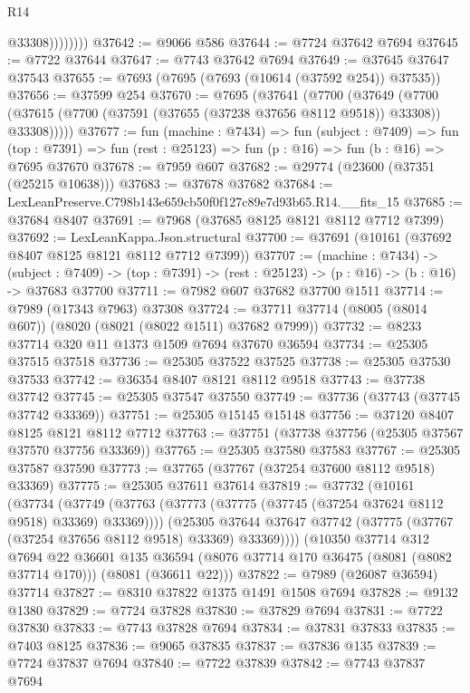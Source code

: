 \begin{lexlean}{R14}
\begin{coremodule}
                    @33308))))))))
@37642 := @9066 @586
@37644 := @7724 @37642 @7694
@37645 := @7722 @37644
@37647 := @7743 @37642 @7694
@37649 := @37645 @37647 @37543
@37655 := @7693 (@7695 (@7693 (@10614 (@37592 @254)) @37535))
@37656 := @37599 @254
@37670 := @7695
    (@37641
      (@7700
        (@37649
          (@7700 (@37615 (@7700 (@37591 (@37655 (@37238 @37656 @8112 @9518)) @33308)) @33308)))))
@37677 := fun (machine : @7434) =>
  fun (subject : @7409) =>
  fun (top : @7391) => fun (rest : @25123) => fun (p : @16) => fun (b : @16) => @7695 @37670
@37678 := @7959 @607
@37682 := @29774 (@23600 (@37351 (@25215 @10638)))
@37683 := @37678 @37682
@37684 := LexLeanPreserve.C798b143e659cb50f0f127c89e7d93b65.R14.__fits_15
@37685 := @37684 @8407
@37691 := @7968 (@37685 @8125 @8121 @8112 @7712 @7399)
@37692 := LexLeanKappa.Json.structural
@37700 := @37691 (@10161 (@37692 @8407 @8125 @8121 @8112 @7712 @7399))
@37707 := (machine : @7434) ->
  (subject : @7409) -> (top : @7391) -> (rest : @25123) -> (p : @16) -> (b : @16) -> @37683 @37700
@37711 := @7982 @607 @37682 @37700 @1511
@37714 := @7989 (@17343 @7963) @37308
@37724 := @37711 @37714 (@8005 (@8014 @607)) (@8020 (@8021 (@8022 @1511) @37682 @7999))
@37732 := @8233 @37714 @320 @11 @1373 @1509 @7694 @37670 @36594
@37734 := @25305 @37515 @37518
@37736 := @25305 @37522 @37525
@37738 := @25305 @37530 @37533
@37742 := @36354 @8407 @8121 @8112 @9518
@37743 := @37738 @37742
@37745 := @25305 @37547 @37550
@37749 := @37736 (@37743 (@37745 @37742 @33369))
@37751 := @25305 @15145 @15148
@37756 := @37120 @8407 @8125 @8121 @8112 @7712
@37763 := @37751 (@37738 @37756 (@25305 @37567 @37570 @37756 @33369))
@37765 := @25305 @37580 @37583
@37767 := @25305 @37587 @37590
@37773 := @37765 (@37767 (@37254 @37600 @8112 @9518) @33369)
@37775 := @25305 @37611 @37614
@37819 := @37732
    (@10161
      (@37734
        (@37749 (@37763 (@37773 (@37775 (@37745 (@37254 @37624 @8112 @9518) @33369) @33369))))
        (@25305 @37644 @37647 @37742 (@37775 (@37767 (@37254 @37656 @8112 @9518) @33369) @33369))))
    (@10350
      @37714
      @312
      @7694
      @22
      @36601
      @135
      @36594
      (@8076 @37714 @170 @36475 (@8081 (@8082 @37714 @170)))
      (@8081 (@36611 @22)))
@37822 := @7989 (@26087 @36594) @37714
@37827 := @8310 @37822 @1375 @1491 @1508 @7694
@37828 := @9132 @1380
@37829 := @7724 @37828
@37830 := @37829 @7694
@37831 := @7722 @37830
@37833 := @7743 @37828 @7694
@37834 := @37831 @37833
@37835 := @7403 @8125
@37836 := @9065 @37835
@37837 := @37836 @135
@37839 := @7724 @37837 @7694
@37840 := @7722 @37839
@37842 := @7743 @37837 @7694

\end{coremodule}
\end{lexlean}
